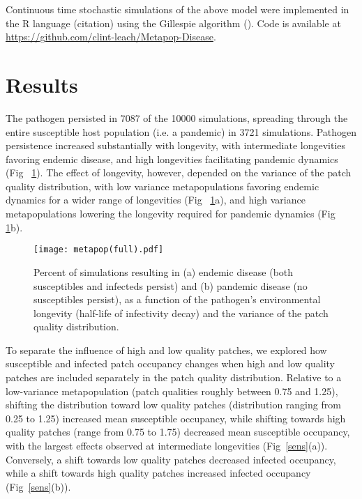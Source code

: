 \documentclass{svjour3}
\begin{document}
Continuous time stochastic simulations of the above model were implemented in the R language (citation) using the Gillespie algorithm (\cite{Gillespie1977}).  Code is available at \url{https://github.com/clint-leach/Metapop-Disease}.

\section{Results}
\label{results}

The pathogen persisted in 7087 of the 10000 simulations, spreading through the entire susceptible host population (i.e. a pandemic) in 3721 simulations.  Pathogen persistence increased substantially with longevity, with intermediate longevities favoring endemic disease, and high longevities facilitating pandemic dynamics (Fig~ \ref{poutcome}).  The effect of longevity, however, depended on the variance of the patch quality distribution, with low variance metapopulations favoring endemic dynamics for a wider range of longevities (Fig~ \ref{poutcome}a), and high variance metapopulations lowering the longevity required for pandemic dynamics (Fig~ \ref{poutcome}b).

\begin{figure}
\centering
\texttt{[image: metapop(full).pdf]}
\caption{Percent of simulations resulting in (a) endemic disease (both susceptibles and infecteds persist) and (b) pandemic disease (no susceptibles persist), as a function of the pathogen's environmental longevity (half-life of infectivity decay) and the variance of the patch quality distribution.}
\label{poutcome}
\end{figure}   

To separate the influence of high and low quality patches, we explored how susceptible and infected patch occupancy changes when high and low quality patches are included separately in the patch quality distribution.  Relative to a low-variance metapopulation (patch qualities roughly between 0.75 and 1.25), shifting the distribution toward low quality patches (distribution ranging from 0.25 to 1.25) increased mean susceptible occupancy, while shifting towards high quality patches (range from 0.75 to 1.75) decreased mean susceptible occupancy, with the largest effects observed at intermediate longevities (Fig~\ref{sens}(a)).  Conversely, a shift towards low quality patches decreased infected occupancy, while a shift towards high quality patches increased infected occupancy (Fig~\ref{sens}(b)).  
\end{document}
